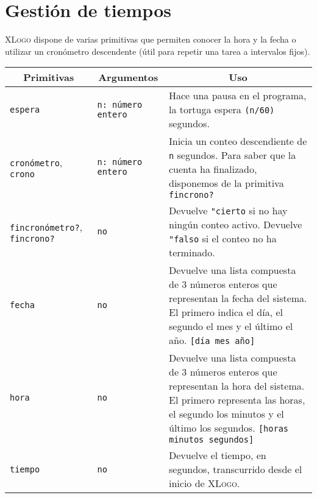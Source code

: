 \chapter{Gesti\'on de tiempos}
   \label{Gestion-Tiempos}

\textsc{XLogo} dispone de varias primitivas que permiten conocer la hora y
la fecha o utilizar un cron\'ometro descendente (\'util para repetir una
tarea a intervalos fijos).
\begin{center} \begin{longtable}{|m{3cm}|m{3cm}|m{9cm}|} \hline 
   \multicolumn{1}{|c|}{\textbf{Primitivas}} &
      \multicolumn{1}{c|}{\textbf{Argumentos}} &
         \multicolumn{1}{c|}{\textbf{Uso}} \\ \endhead \hline 
   \texttt{espera}\index{espera@\texttt{espera}} &
      \texttt{n: n\'umero entero} &
        Hace una pausa en el programa, la tortuga espera
        \texttt{(n/60)} segundos.\\ \hline 
   \texttt{cron\'ometro},\index{cron\'ometro@\texttt{cron\'ometro}}
     \texttt{crono}\index{crono@\texttt{crono}} & 
        \texttt{n: n\'umero entero} &
        Inicia un conteo descendiente de \texttt{n} segundos. Para saber que
        la cuenta ha finalizado, disponemos de la primitiva
        \texttt{fincrono?} \\ \hline 
   \texttt{fincron\'ometro?},\index{fincron\'ometro?@\texttt{fincron\'ometro?}}
      \texttt{fincrono?}\index{fincrono?@\texttt{fincrono?}} & \texttt{no} &
        Devuelve \verb+"cierto+ si no hay ning\'un conteo activo.
        Devuelve \verb+"falso+ si el conteo no ha terminado.\\ \hline 
   \texttt{fecha}\index{fecha@\texttt{fecha}} & \texttt{no} &
        Devuelve una lista compuesta de 3 n\'umeros enteros que representan
        la fecha del sistema. El primero indica el d\'ia, el segundo el mes
        y el \'ultimo el a\~no. \texttt{[d\'ia mes a\~no]} \\ \hline 
   \texttt{hora}\index{hora@\texttt{hora}} & \texttt{no} &
        Devuelve una lista compuesta de 3 n\'umeros enteros que representan
        la hora del sistema. El primero representa las horas, el segundo los
        minutos y el \'ultimo los segundos. \texttt{[horas minutos segundos]}
                        \\ \hline 
   \texttt{tiempo}\index{tiempo@\texttt{tiempo}} & \texttt{no} &
        Devuelve el tiempo, en segundos, transcurrido desde el inicio de
        \textsc{XLogo}.\\ \hline
\end{longtable} \end{center}
